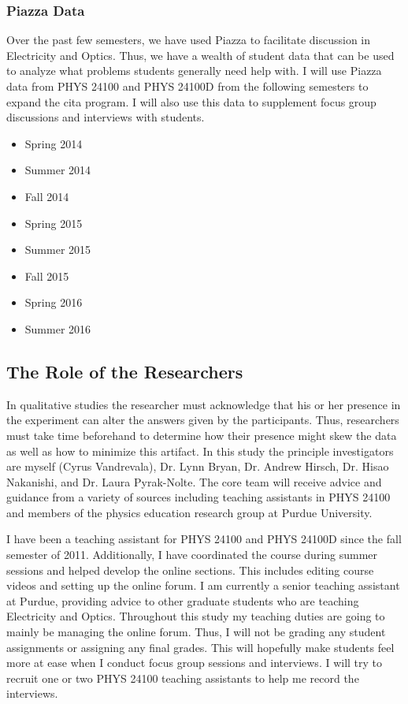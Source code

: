 \subsubsection{Piazza Data}

Over the past few semesters, we have used Piazza\cite{piazza} to facilitate discussion in Electricity and Optics. Thus, we have a wealth of student data that can be used to analyze what problems students generally need help with. I will use Piazza data from PHYS 24100 and PHYS 24100D from the following semesters to expand the \gls{cita} program. I will also use this data to supplement focus group discussions and interviews with students.

\begin{itemize}
\item Spring 2014
\item Summer 2014
\item Fall 2014
\item Spring 2015
\item Summer 2015
\item Fall 2015
\item Spring 2016
\item Summer 2016
\end{itemize}

\subsection{The Role of the Researchers}

In qualitative studies the researcher must acknowledge that his or her presence in the experiment can alter the answers given by the participants. Thus, researchers must take time beforehand to determine how their presence might skew the data as well as how to minimize this artifact\cite{denzin2012}. In this study the principle investigators are myself (Cyrus Vandrevala), Dr. Lynn Bryan, Dr. Andrew Hirsch, Dr. Hisao Nakanishi, and Dr. Laura Pyrak-Nolte. The core team will receive advice and guidance from a variety of sources including teaching assistants in PHYS 24100 and members of the physics education research group at Purdue University.

I have been a teaching assistant for PHYS 24100 and PHYS 24100D since the fall semester of 2011. Additionally, I have coordinated the course during summer sessions and helped develop the online sections. This includes editing course videos and setting up the online forum\cite{piazza}. I am currently a senior teaching assistant at Purdue, providing advice to other graduate students who are teaching Electricity and Optics. Throughout this study my teaching duties are going to mainly be managing the online forum. Thus, I will not be grading any student assignments or assigning any final grades. This will hopefully make students feel more at ease when I conduct focus group sessions and interviews. I will try to recruit one or two PHYS 24100 teaching assistants to help me record the interviews.

